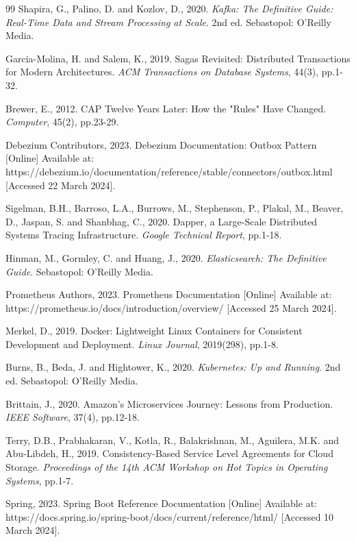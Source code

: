 \begin{thebibliography}{99}
Shapira, G., Palino, D. and Kozlov, D., 2020. \textit{Kafka: The Definitive Guide: Real-Time Data and Stream Processing at Scale}. 2nd ed. Sebastopol: O'Reilly Media.

Garcia-Molina, H. and Salem, K., 2019. Sagas Revisited: Distributed Transactions for Modern Architectures. \textit{ACM Transactions on Database Systems}, 44(3), pp.1-32.

Brewer, E., 2012. CAP Twelve Years Later: How the "Rules" Have Changed. \textit{Computer}, 45(2), pp.23-29.

Debezium Contributors, 2023. Debezium Documentation: Outbox Pattern [Online] Available at: https://debezium.io/documentation/reference/stable/connectors/outbox.html [Accessed 22 March 2024].

Sigelman, B.H., Barroso, L.A., Burrows, M., Stephenson, P., Plakal, M., Beaver, D., Jaspan, S. and Shanbhag, C., 2020. Dapper, a Large-Scale Distributed Systems Tracing Infrastructure. \textit{Google Technical Report}, pp.1-18.

Hinman, M., Gormley, C. and Huang, J., 2020. \textit{Elasticsearch: The Definitive Guide}. Sebastopol: O'Reilly Media.

Prometheus Authors, 2023. Prometheus Documentation [Online] Available at: https://prometheus.io/docs/introduction/overview/ [Accessed 25 March 2024].

Merkel, D., 2019. Docker: Lightweight Linux Containers for Consistent Development and Deployment. \textit{Linux Journal}, 2019(298), pp.1-8.

Burns, B., Beda, J. and Hightower, K., 2020. \textit{Kubernetes: Up and Running}. 2nd ed. Sebastopol: O'Reilly Media.

Brittain, J., 2020. Amazon's Microservices Journey: Lessons from Production. \textit{IEEE Software}, 37(4), pp.12-18.

Terry, D.B., Prabhakaran, V., Kotla, R., Balakrishnan, M., Aguilera, M.K. and Abu-Libdeh, H., 2019. Consistency-Based Service Level Agreements for Cloud Storage. \textit{Proceedings of the 14th ACM Workshop on Hot Topics in Operating Systems}, pp.1-7.

Spring, 2023. Spring Boot Reference Documentation [Online] Available at: https://docs.spring.io/spring-boot/docs/current/reference/html/ [Accessed 10 March 2024].


\end{thebibliography}
